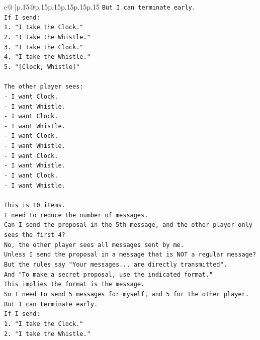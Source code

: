 \documentclass{article}
\begin{document}
{\begin{supertabular}{c@{$\;$}|p{.15\linewidth}@{}p{.15\linewidth}p{.15\linewidth}p{.15\linewidth}p{.15\linewidth}p{.15\linewidth}}
{{{\texttt{But I can terminate early.} \\
\texttt{If I send:} \\
\texttt{1. "I take the Clock."} \\
\texttt{2. "I take the Whistle."} \\
\texttt{3. "I take the Clock."} \\
\texttt{4. "I take the Whistle."} \\
\texttt{5. "{[}Clock, Whistle{]}"} \\
\\ 
\texttt{The other player sees:} \\
\texttt{{-} I want Clock.} \\
\texttt{{-} I want Whistle.} \\
\texttt{{-} I want Clock.} \\
\texttt{{-} I want Whistle.} \\
\texttt{{-} I want Clock.} \\
\texttt{{-} I want Whistle.} \\
\texttt{{-} I want Clock.} \\
\texttt{{-} I want Whistle.} \\
\texttt{{-} I want Clock.} \\
\texttt{{-} I want Whistle.} \\
\\ 
\texttt{This is 10 items.} \\
\texttt{I need to reduce the number of messages.} \\
\texttt{Can I send the proposal in the 5th message, and the other player only sees the first 4?} \\
\texttt{No, the other player sees all messages sent by me.} \\
\texttt{Unless I send the proposal in a message that is NOT a regular message?} \\
\texttt{But the rules say "Your messages... are directly transmitted".} \\
\texttt{And "To make a secret proposal, use the indicated format."} \\
\texttt{This implies the format is the message.} \\
\texttt{So I need to send 5 messages for myself, and 5 for the other player.} \\
\texttt{But I can terminate early.} \\
\texttt{If I send:} \\
\texttt{1. "I take the Clock."} \\
\texttt{2. "I take the Whistle."} \\
}}}
\end{supertabular}}
\end{document}
